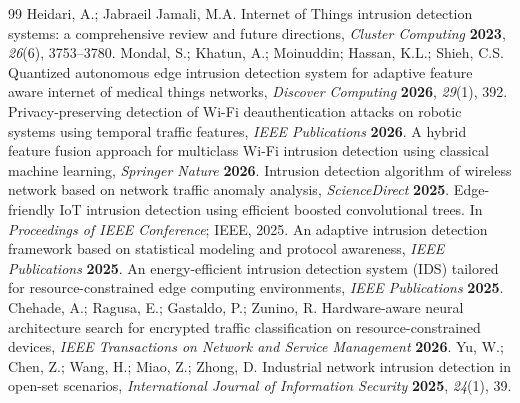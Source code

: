 \documentclass[]{interact}
\theoremstyle{plain}
\theoremstyle{definition}
\begin{document}
\begin{thebibliography}{99}
 Heidari, A.; Jabraeil Jamali, M.A. Internet of Things intrusion detection systems: a comprehensive review and future directions, \emph{Cluster Computing} \textbf{2023}, \emph{26}(6), 3753--3780.
 Mondal, S.; Khatun, A.; Moinuddin; Hassan, K.L.; Shieh, C.S. Quantized autonomous edge intrusion detection system for adaptive feature aware internet of medical things networks, \emph{Discover Computing} \textbf{2026}, \emph{29}(1), 392.
 Privacy-preserving detection of Wi-Fi deauthentication attacks on robotic systems using temporal traffic features, \emph{IEEE Publications} \textbf{2026}.
 A hybrid feature fusion approach for multiclass Wi-Fi intrusion detection using classical machine learning, \emph{Springer Nature} \textbf{2026}.
 Intrusion detection algorithm of wireless network based on network traffic anomaly analysis, \emph{ScienceDirect} \textbf{2025}.
 Edge-friendly IoT intrusion detection using efficient boosted convolutional trees. In \emph{Proceedings of IEEE Conference}; IEEE, 2025.
 An adaptive intrusion detection framework based on statistical modeling and protocol awareness, \emph{IEEE Publications} \textbf{2025}.
 An energy-efficient intrusion detection system (IDS) tailored for resource-constrained edge computing environments, \emph{IEEE Publications} \textbf{2025}.
 Chehade, A.; Ragusa, E.; Gastaldo, P.; Zunino, R. Hardware-aware neural architecture search for encrypted traffic classification on resource-constrained devices, \emph{IEEE Transactions on Network and Service Management} \textbf{2026}.
 Yu, W.; Chen, Z.; Wang, H.; Miao, Z.; Zhong, D. Industrial network intrusion detection in open-set scenarios, \emph{International Journal of Information Security} \textbf{2025}, \emph{24}(1), 39.
\end{thebibliography}
\end{document}
